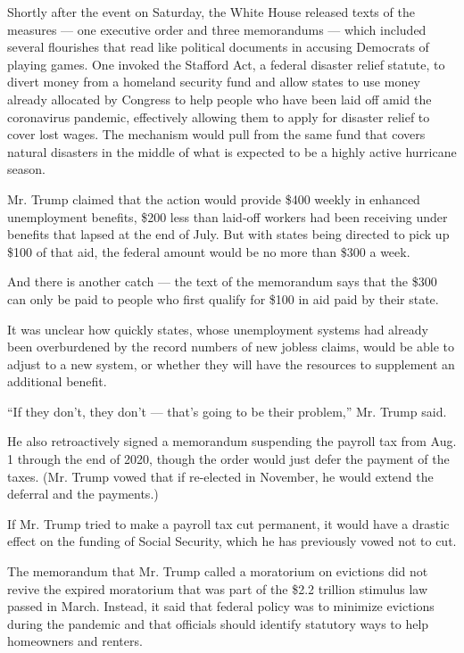 Shortly after the event on Saturday, the White House released texts of
the measures --- one executive order and three memorandums --- which
included several flourishes that read like political documents in
accusing Democrats of playing games. One invoked the Stafford Act, a
federal disaster relief statute, to divert money from a homeland
security fund and allow states to use money already allocated by
Congress to help people who have been laid off amid the coronavirus
pandemic, effectively allowing them to apply for disaster relief to
cover lost wages. The mechanism would pull from the same fund that
covers natural disasters in the middle of what is expected to be a
highly active hurricane season.

Mr. Trump claimed that the action would provide \$400 weekly in enhanced
unemployment benefits, \$200 less than laid-off workers had been
receiving under benefits that lapsed at the end of July. But with states
being directed to pick up \$100 of that aid, the federal amount would be
no more than \$300 a week.

And there is another catch --- the text of the memorandum says that the
\$300 can only be paid to people who first qualify for \$100 in aid paid
by their state.

It was unclear how quickly states, whose unemployment systems had
already been overburdened by the record numbers of new jobless claims,
would be able to adjust to a new system, or whether they will have the
resources to supplement an additional benefit.

``If they don't, they don't --- that's going to be their problem,'' Mr.
Trump said.

He also retroactively signed a memorandum suspending the payroll tax
from Aug. 1 through the end of 2020, though the order would just defer
the payment of the taxes. (Mr. Trump vowed that if re-elected in
November, he would extend the deferral and the payments.)

If Mr. Trump tried to make a payroll tax cut permanent, it would have a
drastic effect on the funding of Social Security, which he has
previously vowed not to cut.

The memorandum that Mr. Trump called a moratorium on evictions did not
revive the expired moratorium that was part of the \$2.2 trillion
stimulus law passed in March. Instead, it said that federal policy was
to minimize evictions during the pandemic and that officials should
identify statutory ways to help homeowners and renters.

